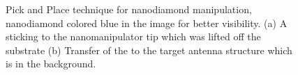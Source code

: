 	\begin{figure}[tp]
		\begin{subfigure}[t]{ 0.49\linewidth}
			\centering
			\caption{}
			\label{subfig::pick_antenna_sem}
		\end{subfigure}
		\hfill
		\begin{subfigure}[t]{ 0.49\linewidth}
			\centering
			\caption{}
			\label{subfig::transfer_antenna_sem}
		\end{subfigure}
		\caption{Pick and Place technique for nanodiamond manipulation, nanodiamond colored blue in the image for better visibility. (a) A \nd sticking to the nanomanipulator tip which was lifted off the substrate (b) Transfer of the \nd to the target antenna structure which is in the background.}
	\end{figure}


